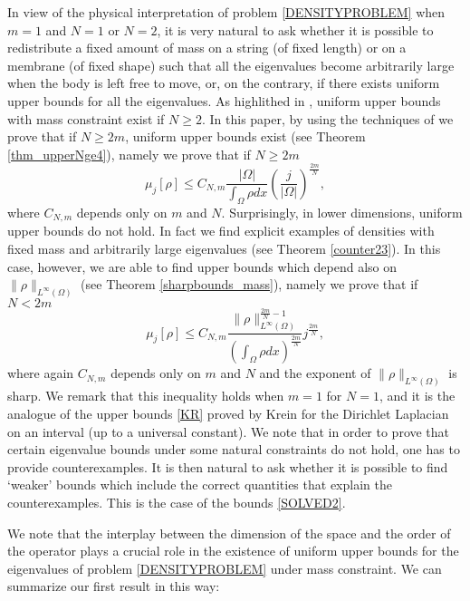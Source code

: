 \documentclass[11pt,a4paper]{amsart}
\numberwithin{equation}{section}
\begin{document}
In view of the physical interpretation of problem \eqref{DENSITYPROBLEM} when $m=1$ and $N=1$ or $N=2$, it is very natural to ask whether it is possible to redistribute a fixed amount of mass on a string (of fixed length) or on a membrane (of fixed shape) such that all the eigenvalues become arbitrarily large when the body is left free to move, or, on the contrary, if there exists uniform upper bounds for all the eigenvalues. As highlithed in \cite{colbois_elsoufi}, uniform upper bounds with mass constraint exist if $N\geq 2$. In this paper, by using the techniques of \cite{colbois_elsoufi} we prove that if $N\geq 2m$, uniform upper bounds exist (see Theorem \ref{thm_upperNge4}), namely we prove that if $N\geq 2m$
\begin{equation}\label{SOLVED}
\mu_j[\rho]\leq C_{N,m}\frac{|\Omega|}{\int_{\Omega}\rho dx}\left(\frac{j}{|\Omega|}\right)^{\frac{2m}{N}},
\end{equation}
where $C_{N,m}$ depends only on $m$ and $N$. Surprisingly, in lower dimensions, uniform upper bounds do not hold. In fact we find explicit examples of densities with fixed mass and arbitrarily large eigenvalues (see Theorem \ref{counter23}). In this case, however, we are able to find upper bounds which depend also on $\|\rho\|_{L^{\infty}(\Omega)}$ (see Theorem \ref{sharpbounds_mass}), namely we prove that if $N<2m$
\begin{equation}\label{SOLVED2}
\mu_j[\rho]\leq C_{N,m}\frac{\|\rho\|_{L^{\infty}(\Omega)}^{\frac{2m}{N}-1}}{\left(\int_{\Omega}\rho dx\right)^{\frac{2m}{N}}}j^{\frac{2m}{N}},
\end{equation}
where again $C_{N,m}$ depends only on $m$ and $N$ and  the exponent of $\|\rho\|_{L^{\infty}(\Omega)}$ is sharp. We remark that this inequality holds when $m=1$ for $N=1$, and it is the analogue of the upper bounds \eqref{KR} proved by Krein \cite{krein} for the Dirichlet Laplacian on an interval (up to a universal constant). We note that in order to prove that  certain eigenvalue bounds under some natural constraints do not hold, one has to provide counterexamples. It is then natural to ask whether it is possible to find `weaker' bounds which include the correct quantities that explain  the counterexamples. This is the case of the bounds \eqref{SOLVED2}.

We note that the interplay between the dimension of the space and the order of the operator plays a crucial role in the existence of uniform upper bounds for the eigenvalues of problem \eqref{DENSITYPROBLEM} under mass constraint. We can summarize our first result in this way: 
\end{document}
